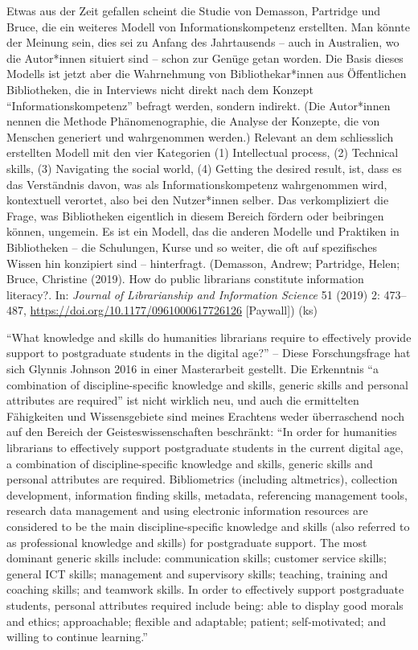 \documentclass[a4paper,
fontsize=11pt,
oneside,
numbers=noperiodatend,
parskip=half-,
bibliography=totoc,
final
]{scrartcl}
\begin{document}
Etwas aus der Zeit gefallen scheint die Studie von Demasson, Partridge
und Bruce, die ein weiteres Modell von Informationskompetenz erstellten.
Man könnte der Meinung sein, dies sei zu Anfang des Jahrtausends -- auch
in Australien, wo die Autor*innen situiert sind -- schon zur Genüge
getan worden. Die Basis dieses Modells ist jetzt aber die Wahrnehmung
von Bibliothekar*innen aus Öffentlichen Bibliotheken, die in Interviews
nicht direkt nach dem Konzept \enquote{Informationskompetenz} befragt
werden, sondern indirekt. (Die Autor*innen nennen die Methode
Phänomenographie, die Analyse der Konzepte, die von Menschen generiert
und wahrgenommen werden.) Relevant an dem schliesslich erstellten Modell
mit den vier Kategorien (1) Intellectual process, (2) Technical skills,
(3) Navigating the social world, (4) Getting the desired result, ist,
dass es das Verständnis davon, was als Informationskompetenz
wahrgenommen wird, kontextuell verortet, also bei den Nutzer*innen
selber. Das verkompliziert die Frage, was Bibliotheken eigentlich in
diesem Bereich fördern oder beibringen können, ungemein. Es ist ein
Modell, das die anderen Modelle und Praktiken in Bibliotheken -- die
Schulungen, Kurse und so weiter, die oft auf spezifisches Wissen hin
konzipiert sind -- hinterfragt. (Demasson, Andrew; Partridge, Helen;
Bruce, Christine (2019). How do public librarians constitute information
literacy?. In: \emph{Journal of Librarianship and Information Science}
51 (2019) 2: 473--487, \url{https://doi.org/10.1177/0961000617726126}
{[}Paywall{]}) (ks)

\enquote{What knowledge and skills do humanities librarians require to
effectively provide support to postgraduate students in the digital
age?} -- Diese Forschungsfrage hat sich Glynnis Johnson 2016 in einer
Masterarbeit gestellt. Die Erkenntnis \enquote{a combination of
discipline-specific knowledge and skills, generic skills and personal
attributes are required} ist nicht wirklich neu, und auch die
ermittelten Fähigkeiten und Wissensgebiete sind meines Erachtens weder
überraschend noch auf den Bereich der Geisteswissenschaften beschränkt:
\enquote{In order for humanities librarians to effectively support
postgraduate students in the current digital age, a combination of
discipline-specific knowledge and skills, generic skills and personal
attributes are required. Bibliometrics (including altmetrics),
collection development, information finding skills, metadata,
referencing management tools, research data management and using
electronic information resources are considered to be the main
discipline-specific knowledge and skills (also referred to as
professional knowledge and skills) for postgraduate support. The most
dominant generic skills include: communication skills; customer service
skills; general ICT skills; management and supervisory skills; teaching,
training and coaching skills; and teamwork skills. In order to
effectively support postgraduate students, personal attributes required
include being: able to display good morals and ethics; approachable;
flexible and adaptable; patient; self-motivated; and willing to continue
learning.}
\end{document}
